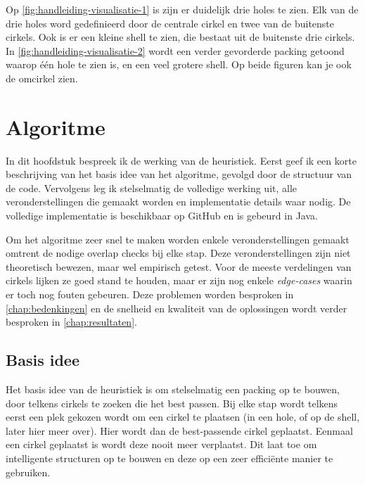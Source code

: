 \documentclass[12pt,a4paper,oneside]{book}
\begin{document}
Op \autoref{fig:handleiding-visualisatie-1} is zijn er duidelijk drie holes te zien.
Elk van de drie holes word gedefinieerd door de centrale cirkel en twee van de buitenste cirkels.
Ook is er een kleine shell te zien, die bestaat uit de buitenste drie cirkels.
In \autoref{fig:handleiding-visualisatie-2} wordt een verder gevorderde packing getoond waarop één hole te zien is, en een veel grotere shell.
Op beide figuren kan je ook de omcirkel zien.

\chapter{Algoritme} \label{chap:algoritme}

In dit hoofdstuk bespreek ik de werking van de heuristiek.
Eerst geef ik een korte beschrijving van het basis idee van het algoritme, gevolgd door de structuur van de code.
Vervolgens leg ik stelselmatig de volledige werking uit, alle veronderstellingen die gemaakt worden en implementatie details waar nodig.
De volledige implementatie is beschikbaar op GitHub \cite{circle-packing-github} en is gebeurd in Java.

Om het algoritme zeer snel te maken worden enkele veronderstellingen gemaakt omtrent de nodige overlap checks bij elke stap.
Deze veronderstellingen zijn niet theoretisch bewezen, maar wel empirisch getest.
Voor de meeste verdelingen van cirkels lijken ze goed stand te houden, maar er zijn nog enkele \textit{edge-cases} waarin er toch nog fouten gebeuren.
Deze problemen worden besproken in \autoref{chap:bedenkingen} en de snelheid en kwaliteit van de oplossingen wordt verder besproken in \autoref{chap:resultaten}.

\section{Basis idee}

Het basis idee van de heuristiek is om stelselmatig een packing op te bouwen, door telkens cirkels te zoeken die het best passen.
Bij elke stap wordt telkens eerst een plek gekozen wordt om een cirkel te plaatsen (in een hole, of op de shell, later hier meer over).
Hier wordt dan de best-passende cirkel geplaatst.
Eenmaal een cirkel geplaatst is wordt deze nooit meer verplaatst.
Dit laat toe om intelligente structuren op te bouwen en deze op een zeer efficiënte manier te gebruiken.
\end{document}
